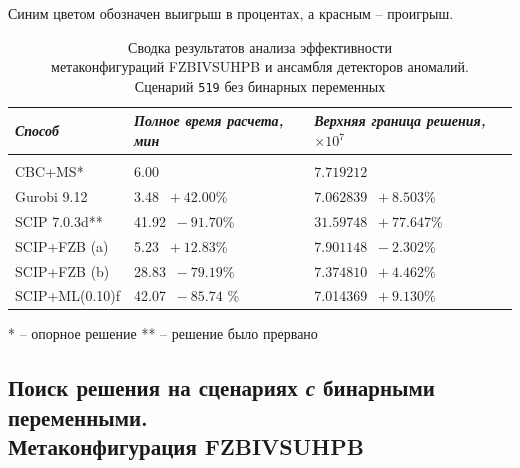 \documentclass[%
	11pt,
	a4paper,
	utf8,
		]{article}
\begin{document}
Синим цветом обозначен выигрыш в процентах, а красным -- проигрыш.

{
	\begin{table}[!h]
		\centering
		\caption{Сводка результатов анализа эффективности \\метаконфигураций FZBIVSUHPB и ансамбля детекторов аномалий. \\Сценарий \texttt{519} без бинарных переменных}
		\begin{tabular}{ p{3.3cm} p{3.3cm} p{3.4cm} }
			\emph{Способ} & \emph{Полное время расчета, мин} & \emph{Верхняя граница решения, $ \times 10^{7} $} \\
			\hline\hline\\[-3.5mm]
			{CBC+MS}* & 6.00 & $ 7.719212 $ \\
			\hline
			Gurobi 9.12 & 3.48 {\color{blue} $\ +42.00 $\%} & $ 7.062839 $ {\color{blue} $\ +8.503 $\%} \\
			\hline
			SCIP 7.0.3d** & 41.92 {\color{red} $\ -91.70 $\%} & $ 31.59748 $ {\color{red} $\ +77.647 $\%} \\
			\hline
			SCIP+FZB (a) & 5.23 {\color{blue} $\ +12.83 $\%} & $ 7.901148 $ {\color{red} $\ -2.302 $\%} \\
			\hline
			SCIP+FZB (b) & 28.83 {\color{red} $\ -79.19 $\%} & $ 7.374810 $ {\color{blue} $\ +4.462 $\%} \\
			\hline
			SCIP+ML(0.10)f & 42.07 {\color{red} $\ -85.74 $ \%} & 7.014369 {\color{blue} $\ +9.130 $\%} \\
			\hline
		\end{tabular}\label{tab:519_wo_bins}
	\end{table}
\vspace{-5mm}\hspace{30mm}\small{* -- опорное решение}
\hspace{15mm}\small{** -- решение было прервано}
}


\subsection{Поиск решения на сценариях \emph{с} бинарными переменными. \\Метаконфигурация FZBIVSUHPB}\label{sec:ikp_bins}
\end{document}
